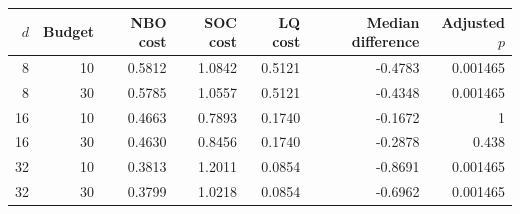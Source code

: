 \begin{tabular}{r r r r r r r}
\toprule
$d$ & Budget & NBO cost & SOC cost & LQ cost & Median difference & Adjusted $p$ \\
\midrule
8 & 10 & 0.5812 & 1.0842 & 0.5121 & -0.4783 & 0.001465 \\
8 & 30 & 0.5785 & 1.0557 & 0.5121 & -0.4348 & 0.001465 \\
16 & 10 & 0.4663 & 0.7893 & 0.1740 & -0.1672 & 1 \\
16 & 30 & 0.4630 & 0.8456 & 0.1740 & -0.2878 & 0.438 \\
32 & 10 & 0.3813 & 1.2011 & 0.0854 & -0.8691 & 0.001465 \\
32 & 30 & 0.3799 & 1.0218 & 0.0854 & -0.6962 & 0.001465 \\
\bottomrule
\end{tabular}
